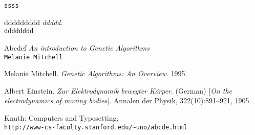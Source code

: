 \begin{thebibliography}{99}

  
\texttt{ssss}

ddddddddd
\textit{ddddd}.\\
\texttt{dddddddd}

Abcdef
\textit{An introduction to Genetic Algorithms}\\
\texttt{Melanie Mitchell}

Melanie Mitchell. 
\textit{Genetic Algorithms: An Overview}. 
1995.

Albert Einstein. 
\textit{Zur Elektrodynamik bewegter K{\"o}rper}. (German) 
[\textit{On the electrodynamics of moving bodies}]. 
Annalen der Physik, 322(10):891–921, 1905.

Knuth: Computers and Typesetting,
\\\texttt{http://www-cs-faculty.stanford.edu/\~{}uno/abcde.html}

\end{thebibliography}